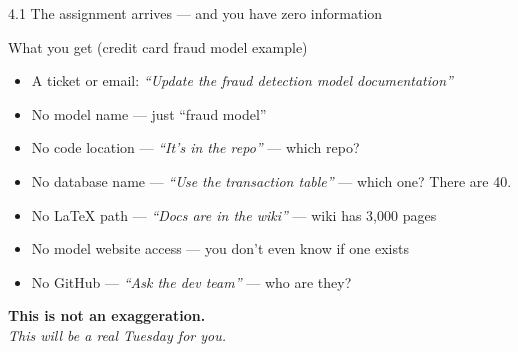 \documentclass[aspectratio=169, 11pt]{beamer}
\begin{document}
	\begin{frame}{4.1 The assignment arrives — and you have zero information}
		\begin{block}{What you get (credit card fraud model example)}
			\begin{itemize}
				\item A ticket or email: \textit{``Update the fraud detection model documentation''}
				\item No model name — just ``fraud model''
				\item No code location — \textit{``It's in the repo''} — which repo?
				\item No database name — \textit{``Use the transaction table''} — which one? There are 40.
				\item No LaTeX path — \textit{``Docs are in the wiki''} — wiki has 3,000 pages
				\item No model website access — you don't even know if one exists
				\item No GitHub — \textit{``Ask the dev team''} — who are they?
			\end{itemize}
		\end{block}
		\vspace{0.1cm}
		\alert{\textbf{This is not an exaggeration.}} \\
		\textit{This will be a real Tuesday for you.}
	\end{frame}
	
\end{document}
